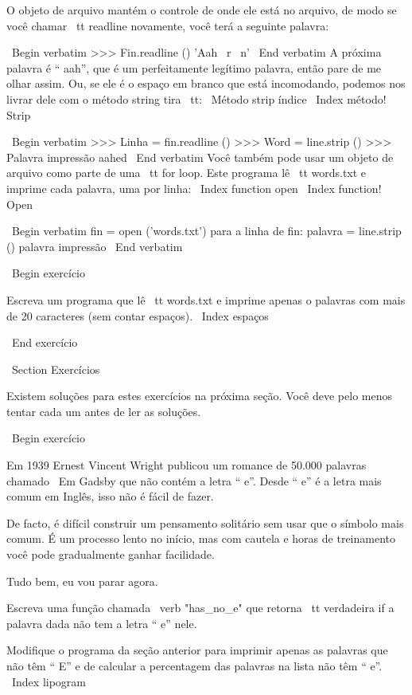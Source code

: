\documentclass[10pt]{book}
\begin{document}
{{{{{{O objeto de arquivo mantém o controle de onde ele está no arquivo, de modo
se você chamar {\ tt readline} novamente, você terá a seguinte palavra:

\ Begin {verbatim}
>>> Fin.readline ()
'Aah \ r \ n'
\ End {verbatim}
%
A próxima palavra é `` aah'', que é um perfeitamente legítimo
palavra, então pare de me olhar assim.
Ou, se ele é o espaço em branco que está incomodando,
podemos nos livrar dele com o método string {tira \ tt}:
\ {Método strip} índice
\ Index {método! Strip}

\ Begin {verbatim}
>>> Linha = fin.readline ()
>>> Word = line.strip ()
>>> Palavra impressão
aahed
\ End {verbatim}
%
Você também pode usar um objeto de arquivo como parte de uma {\ tt for} loop.
Este programa lê {\ tt words.txt} e imprime cada palavra, uma
por linha:
\ Index {function open}
\ Index {function! Open}

\ Begin {verbatim}
fin = open ('words.txt')
para a linha de fin:
    palavra = line.strip ()
    palavra impressão
\ End {verbatim}
%

\ Begin {} exercício

Escreva um programa que lê {\ tt words.txt} e imprime apenas o
palavras com mais de 20 caracteres (sem contar espaços).
\ Index {espaços}

\ End {} exercício


\ Section {Exercícios}

Existem soluções para estes exercícios na próxima seção.
Você deve pelo menos tentar cada um antes de ler as soluções.

\ Begin {} exercício

Em 1939 Ernest Vincent Wright publicou um romance de 50.000 palavras chamado
{\ Em Gadsby} que não contém a letra `` e''. Desde `` e'' é
a letra mais comum em Inglês, isso não é fácil de fazer.

De facto, é difícil construir um pensamento solitário sem usar
que o símbolo mais comum. É um processo lento no início, mas com cautela
e horas de treinamento você pode gradualmente ganhar facilidade.

Tudo bem, eu vou parar agora.

Escreva uma função chamada \ verb "has_no_e" que retorna {\ tt verdadeira} if
a palavra dada não tem a letra `` e'' nele.

Modifique o programa da seção anterior para imprimir apenas as palavras
que não têm `` E'' e de calcular a percentagem das palavras na lista
não têm `` e''.
\ Index {} lipogram

}}}}}}
\end{document}
